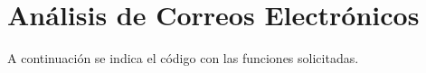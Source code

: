 \section{Análisis de Correos Electrónicos}

  A continuación se indica el código con las funciones
  solicitadas.
  
    